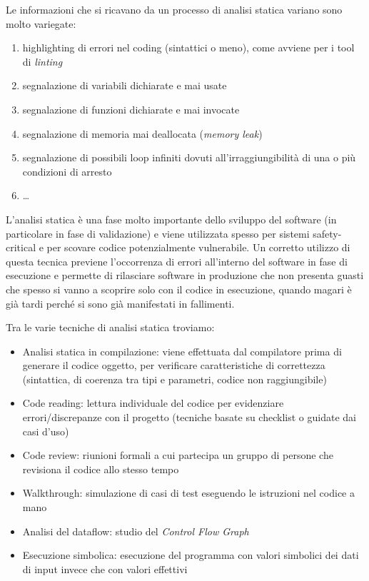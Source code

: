 \documentclass{article}
\begin{document}
Le informazioni che si ricavano da un processo di analisi statica variano sono
molto variegate:

\begin{enumerate}
    \item highlighting di errori nel coding (sintattici o meno), come avviene
    per i tool di \emph{linting}
    \item segnalazione di variabili dichiarate e mai usate
    \item segnalazione di funzioni dichiarate e mai invocate
    \item segnalazione di memoria mai deallocata (\emph{memory leak})
    \item segnalazione di possibili loop infiniti dovuti all'irraggiungibilità
    di una o più condizioni di arresto
    \item \ldots
\end{enumerate}

L'analisi statica è una fase molto importante dello sviluppo del software (in
particolare in fase di validazione) e viene utilizzata spesso per sistemi
safety-critical e per scovare codice potenzialmente vulnerabile. Un corretto
utilizzo di questa tecnica previene l'occorrenza di errori all'interno del
software in fase di esecuzione e permette di rilasciare software in produzione
che non presenta guasti che spesso si vanno a scoprire solo con il codice in
esecuzione, quando magari è già tardi perché si sono già manifestati in fallimenti.

Tra le varie tecniche di analisi statica troviamo:

\begin{itemize}
    \item Analisi statica in compilazione: viene effettuata dal compilatore
    prima di generare il codice oggetto, per verificare caratteristiche di
    correttezza (sintattica, di coerenza tra tipi e parametri, codice non raggiungibile)
    \item Code reading: lettura individuale del codice per evidenziare
    errori/discrepanze con il progetto (tecniche basate su checklist o guidate
    dai casi d'uso)
    \item Code review: riunioni formali a cui partecipa un gruppo di persone che
    revisiona il codice allo stesso tempo
    \item Walkthrough: simulazione di casi di test eseguendo le istruzioni nel
    codice a mano
    \item Analisi del dataflow: studio del \emph{Control Flow Graph}
    \item Esecuzione simbolica: esecuzione del programma con valori simbolici
    dei dati di input invece che con valori effettivi
\end{itemize}
\end{document}
